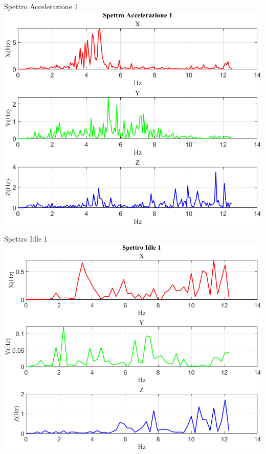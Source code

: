 \documentclass[beamer]{standalone}
\begin{document}
	\begin{frame}{{Spettro Accelerazione 1}}
		\centering\includegraphics[height=.8\textheight]{figure/Acc/Trasformata/Spettro Accelerazione 1}
	\end{frame}
	
	\begin{frame}{{Spettro Idle 1}}
		\centering\includegraphics[height=.8\textheight]{figure/Acc/Trasformata/Spettro Idle 1}
	\end{frame}
	
\end{document}

